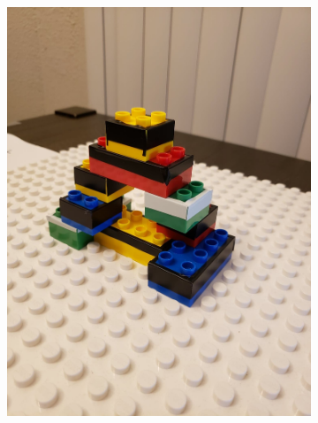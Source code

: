 \begin{figure}[H]
\begin{subfigure}{0.5\textwidth}
       \caption[{}]{\label{fig:fig_3-6b}}
    \end{subfigure}
    \begin{subfigure}{0.5\textwidth}
       \centering
       \includegraphics[width=0.8\linewidth,trim={0 15cm 0 15cm},clip]{figures/t3.jpg}
       

\end{subfigure}
\end{figure}

